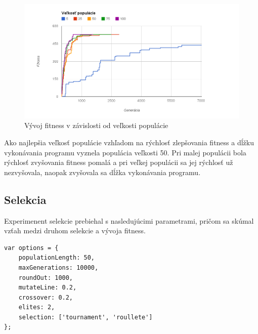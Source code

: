 \begin{figure}[H]
	\centering
	\includegraphics[width=1.0\textwidth]{population.png}
	\caption[Vývoj fitness v závislosti od veľkosti populácie]{
		Vývoj fitness v závislosti od veľkosti populácie}
	\label{fig: population}
\end{figure}

Ako najlepšia veľkosť populácie vzhľadom na rýchlosť zlepšovania fitness a dĺžku vykonávania programu vyznela populácia veľkosti 50. Pri malej populácii bola rýchlosť zvyšovania fitness pomalá a pri veľkej populácii sa jej rýchlosť už nezvyšovala, naopak zvyšovala sa dĺžka vykonávania programu.


\subsection{Selekcia} %
\label{sub:selekcia}

Experimenent selekcie prebiehal s nasledujúcimi parametrami, pričom sa skúmal vzťah medzi druhom selekcie a vývoja fitness.

\begin{verbatim}
var options = {
    populationLength: 50,
    maxGenerations: 10000,
    roundOut: 1000,
    mutateLine: 0.2,
    crossover: 0.2,
    elites: 2,
    selection: ['tournament', 'roullete']
};
\end{verbatim}

